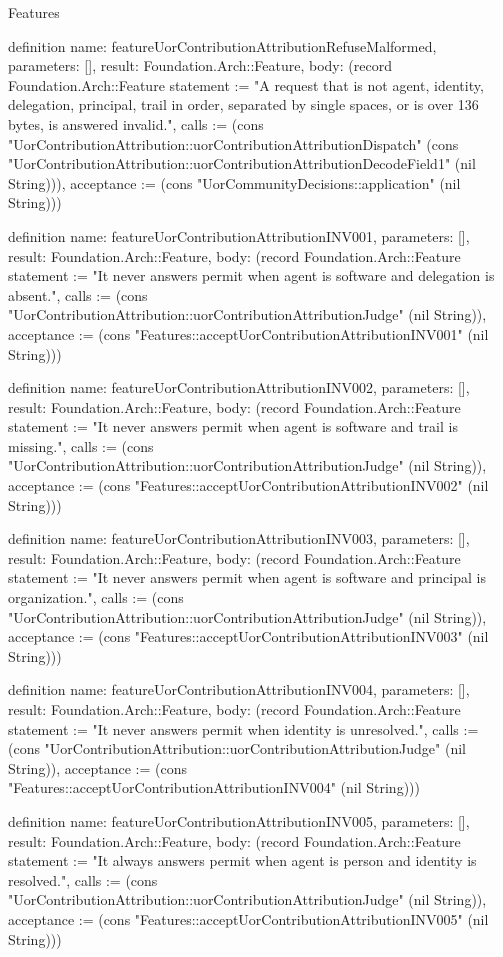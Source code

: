 \begin{lexlean}{Features}
\begin{semanticmodule}
definition{
  name: featureUorContributionAttributionRefuseMalformed,
  parameters: [],
  result: Foundation.Arch::Feature,
  body: (record Foundation.Arch::Feature {statement := "A request that is not agent, identity, delegation, principal, trail in order, separated by single spaces, or is over 136 bytes, is answered invalid.", calls := (cons "UorContributionAttribution::uorContributionAttributionDispatch" (cons "UorContributionAttribution::uorContributionAttributionDecodeField1" (nil String))), acceptance := (cons "UorCommunityDecisions::application" (nil String))})
}

definition{
  name: featureUorContributionAttributionINV001,
  parameters: [],
  result: Foundation.Arch::Feature,
  body: (record Foundation.Arch::Feature {statement := "It never answers permit when agent is software and delegation is absent.", calls := (cons "UorContributionAttribution::uorContributionAttributionJudge" (nil String)), acceptance := (cons "Features::acceptUorContributionAttributionINV001" (nil String))})
}

definition{
  name: featureUorContributionAttributionINV002,
  parameters: [],
  result: Foundation.Arch::Feature,
  body: (record Foundation.Arch::Feature {statement := "It never answers permit when agent is software and trail is missing.", calls := (cons "UorContributionAttribution::uorContributionAttributionJudge" (nil String)), acceptance := (cons "Features::acceptUorContributionAttributionINV002" (nil String))})
}

definition{
  name: featureUorContributionAttributionINV003,
  parameters: [],
  result: Foundation.Arch::Feature,
  body: (record Foundation.Arch::Feature {statement := "It never answers permit when agent is software and principal is organization.", calls := (cons "UorContributionAttribution::uorContributionAttributionJudge" (nil String)), acceptance := (cons "Features::acceptUorContributionAttributionINV003" (nil String))})
}

definition{
  name: featureUorContributionAttributionINV004,
  parameters: [],
  result: Foundation.Arch::Feature,
  body: (record Foundation.Arch::Feature {statement := "It never answers permit when identity is unresolved.", calls := (cons "UorContributionAttribution::uorContributionAttributionJudge" (nil String)), acceptance := (cons "Features::acceptUorContributionAttributionINV004" (nil String))})
}

definition{
  name: featureUorContributionAttributionINV005,
  parameters: [],
  result: Foundation.Arch::Feature,
  body: (record Foundation.Arch::Feature {statement := "It always answers permit when agent is person and identity is resolved.", calls := (cons "UorContributionAttribution::uorContributionAttributionJudge" (nil String)), acceptance := (cons "Features::acceptUorContributionAttributionINV005" (nil String))})
}


\end{semanticmodule}
\end{lexlean}
